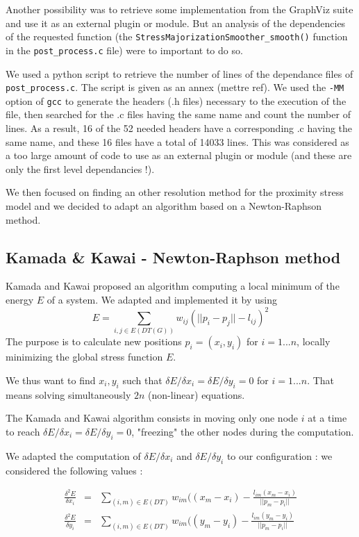 \documentclass[12pt]{report}
\begin{document}
\bigskip
Another possibility was to retrieve some implementation from the GraphViz suite and use it as an external plugin or module. 
But an analysis of the dependencies of the requested function (the \texttt{StressMajorizationSmoother\_smooth()} function in the \texttt{post\_process.c} file) were to important to do so.

We used a python script to retrieve the number of lines of the dependance files of \texttt{post\_process.c}. The script is given as an annex (mettre ref). We used the \texttt{-MM} option of \texttt{gcc} to generate the headers (.h files) necessary to the execution of the file, then searched for the .c files having the same name and count the number of lines. As a result, 16 of the 52 needed headers have a corresponding .c having the same name, and these 16 files have a total of 14033 lines.
This was considered as a too large amount of code to use as an external plugin or module (and these are only the first level dependancies !).

\bigskip
We then focused on finding an other resolution method for the proximity stress model and we decided to adapt an algorithm based on a Newton-Raphson method.

\subsection{Kamada \& Kawai - Newton-Raphson method}

Kamada and Kawai \cite{Kamada89} proposed an algorithm computing a local minimum of the energy $E$ of a system. We adapted and implemented it by using 
\[ E = \sum_{i,j \in E(DT(G))} w_{ij}(||p_i - p_j|| - l_{ij})^2 \]
The purpose is to calculate new positions $p_i = (x_i, y_i)$ for $i = 1... n$, locally minimizing the global stress function $E$. 

We thus want to find $x_i, y_i$ such that $\delta E / \delta x_i = \delta E / \delta y_i = 0$ for $i = 1... n$. That means solving simultaneously $2n$ (non-linear) equations.

\bigskip
The Kamada and Kawai algorithm consists in moving only one node $i$ at a time to reach $\delta E / \delta x_i = \delta E / \delta y_i = 0$, "freezing" the other nodes during the computation.

We adapted the computation of $\delta E / \delta x_i$ and $\delta E / \delta y_i$ to our configuration : we considered the following values :

\begin{eqnarray*}
\frac{\delta^2 E}{\delta x_i}  & = & \sum_{(i,m) \in E(DT)} w_{im} ( (x_m - x_i) - \frac{l_{im} (x_m - x_i)}{||p_m - p_i||} \\
\frac{\delta^2 E}{\delta y_i}  & = & \sum_{(i,m) \in E(DT)} w_{im} ( (y_m - y_i) - \frac{l_{im} (y_m - y_i)}{||p_m - p_i||}
\end{eqnarray*}
 
\end{document}
